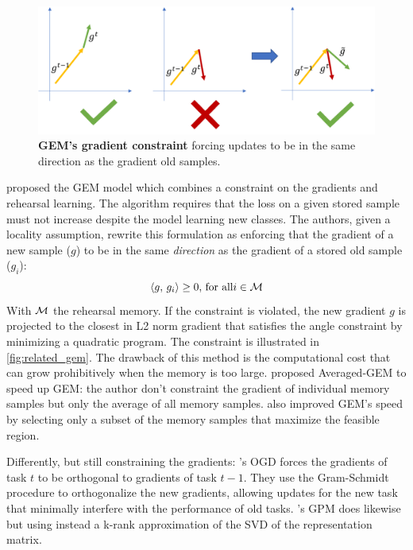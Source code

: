 \begin{figure}[tb]
    \begin{center}
        \includegraphics[width=1.0\linewidth]{images/related/gem.pdf}
    \end{center}
    \caption{\textbf{GEM's gradient constraint} forcing updates to be in the same direction as the
        gradient \wrt old samples.}
    \label{fig:related_gem}
\end{figure}

\cite{lopezpaz2017gem} proposed the GEM model which combines a constraint on the gradients and
rehearsal learning. The algorithm requires that the loss on a given stored sample must not increase
despite the model learning new classes. The authors, given a locality assumption, rewrite this
formulation as enforcing that the gradient of a new sample ($g$) to be in the same \textit{direction} as
the gradient of a stored old sample ($g_i$):
%
\begin{equation}
    \langle g,\, g_i\rangle \ge 0,\, \text{for all} i \in \mathcal{M}
\end{equation}
%
With $\mathcal{M}$ the rehearsal memory. If the constraint is violated, the new gradient $g$ is projected
to the closest in L2 norm gradient that satisfies the angle constraint by minimizing a quadratic
program. The constraint is illustrated in \autoref{fig:related_gem}. The drawback of this method is
the computational cost that can grow prohibitively when the memory is too large.
\cite{chaudhry2019AGEM} proposed Averaged-GEM to speed up GEM: the author don't constraint the
gradient of individual memory samples but only the average of all memory samples.
\cite{aljundi2019gradientselection} also improved GEM's speed by selecting only a subset of the
memory samples that maximize the feasible region.

Differently, but still constraining the gradients: \cite{farajtabar2020ogd}'s OGD forces the gradients of
task $t$ to be orthogonal to gradients of task $t-1$. They use the Gram-Schmidt procedure to
orthogonalize the new gradients, allowing updates for the new task that minimally interfere with the
performance of old tasks. \cite{saha2021gpm}'s GPM does likewise but using instead a k-rank
approximation of the SVD of the representation matrix.


